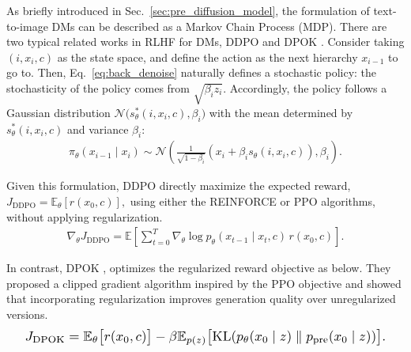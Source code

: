 As briefly introduced in Sec.~\ref{sec:pre_diffusion_model}, the formulation of text-to-image DMs can be described as a Markov Chain Process (MDP). There are two typical related works in RLHF for DMs, DDPO \citep{black2023training} and DPOK \citep{fan2024reinforcement}. Consider taking $(i, x_i, c)$ as the state space, and define the action as the next hierarchy $x_{i-1}$ to go to. Then, Eq.~\ref{eq:back_denoise} naturally defines a stochastic policy: the stochasticity of the policy comes from $\sqrt{\beta_i z_i}$. Accordingly, the policy follows a Gaussian distribution $\mathcal{N} \big(s_\theta^* (i, x_i, c), \beta_i \big)$ with the mean determined by $s_\theta^* (i, x_i, c)$ and variance $\beta_i$:
\begin{equation}
\begin{aligned}
\pi_\theta(x_{i-1} \mid x_i) \sim  \mathcal{N} \left(\frac{1}{\sqrt{1 - \beta_i}} \left( x_i + \beta_i s_\theta(i, x_i, c) \right), \beta_i \right). \nonumber
\end{aligned}
\end{equation}

Given this formulation, DDPO \citep{black2023training} directly maximize the expected reward, 
$J_{\text{DDPO}} = \mathbb{E}_\theta [r(x_0, c)],$
using either the REINFORCE or PPO algorithms, without applying regularization.
\vspace{-5pt}
\begin{equation}
\begin{aligned}
\nabla_\theta J_{\text{DDPO}} = \mathbb{E} \left[ 
\sum_{t=0}^{T} \nabla_\theta \log p_\theta(x_{t-1} \mid x_t, c) \, r(x_0, c)
\right]. \nonumber
\end{aligned}
\end{equation}

In contrast, DPOK \citep{fan2024reinforcement}, optimizes the regularized reward objective as below. They proposed a clipped gradient algorithm inspired by the PPO objective and showed that incorporating regularization improves generation quality over unregularized versions.
\begin{equation}
\resizebox{.95\linewidth}{!}{$
\begin{aligned}
J_{\text{DPOK}} = \mathbb{E}_\theta \big[r(x_0, c)\big] 
- \beta \mathbb{E}_{p(z)} \big[\text{KL}(p_\theta(x_0 \mid z) \parallel p_{\text{pre}}(x_0 \mid z))\big]. \nonumber
\end{aligned}$}
\end{equation}

